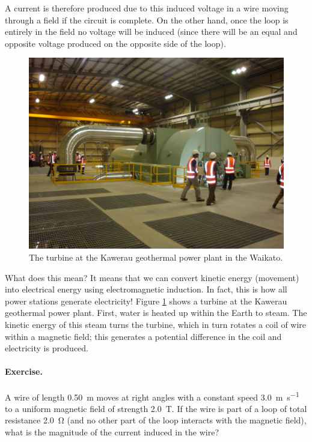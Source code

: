 \documentclass[a4paper]{amsbook}
\newcommand\capcite[1]{}
\begin{document}
A current is therefore produced due to this induced voltage in a wire moving through a field if the circuit is complete. On the other
hand, once the loop is entirely in the field no voltage will be induced (since there will be an equal and opposite voltage produced on
the opposite side of the loop).

\begin{figure}
  \centering
  \includegraphics[width=\textwidth]{turbine}
  \caption{The turbine at the Kawerau geothermal power plant in the Waikato. \capcite{https://upload.wikimedia.org/wikipedia/commons/8/8c/Turbine_Hall_Kawerau_New_Zealand.jpg}\label{fig:turbine}}
\end{figure}
What does this mean? It means that we can convert kinetic energy (movement) into electrical energy using electromagnetic induction. In
fact, this is how all power stations generate electricity! Figure \ref{fig:turbine} shows a turbine at the Kawerau geothermal power plant. First,
water is heated up within the Earth to steam. The kinetic energy of this steam turns the turbine, which in turn rotates a coil of wire within
a magnetic field; this generates a potential difference in the coil and electricity is produced.

\paragraph{Exercise.} A wire of length \SI{0.50}{\metre} moves at right angles with a constant speed \SI{3.0}{\metre\per\second} to a uniform
magnetic field of strength \SI{2.0}{\tesla}. If the wire is part of a loop of total resistance \SI{2.0}{\ohm} (and no other part of the loop
interacts with the magnetic field), what is the magnitude of the current induced in the wire?
\end{document}
